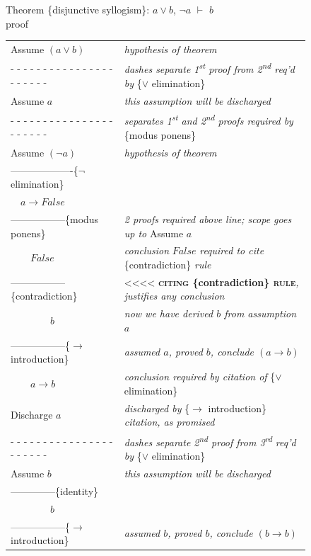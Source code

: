 {{\begin{figure}
Theorem \{disjunctive syllogism\}: $a \vee b$, $\neg a$ $\vdash$ $b$ \\
proof
\begin{center}
\begin{tabular}{ll}
Assume $(a \vee b)$          &\emph{hypothesis of theorem}\\
 - - - - - - - - - - - - - - - - - - - - - -&\emph{dashes separate 1\textsuperscript{st} proof from 2\textsuperscript{nd} req'd by} \{$\vee$ elimination\}\\
Assume $a$          & \emph{this assumption will be discharged}\\
 - - - - - - - - - - - - - - - - - - - - - -& \emph{separates 1\textsuperscript{st} and 2\textsuperscript{nd} proofs required by} \{modus ponens\} \\
Assume $(\neg a)$        & \emph{hypothesis of theorem}\\
-------------------\{$\neg$ elimination\} \\
~~$a \rightarrow False$ &\\
-----------------\{modus ponens\} &\emph{2 proofs required above line; scope goes up to} Assume $a$\\
~~~~$False$            &\emph{conclusion} $False$ \emph{required to cite} \{contradiction\} \emph{rule}\\
-----------------\{contradiction\} &<<<< \textbf{\textsc{citing} \{contradiction\} \textsc{rule}}\emph{, justifies any conclusion}\\
~~~~~~~~$b$              &\emph{now we have derived $b$ from assumption $a$}\\
-----------------\{$\rightarrow$ introduction\} & \emph{assumed $a$, proved $b$, conclude $(a \rightarrow b)$}\\
~~~~$a \rightarrow b$ &\emph{conclusion required by citation of} \{$\vee$ elimination\} \\
Discharge $a$    &\emph{discharged by} \{$\rightarrow$ introduction\} \emph{citation, as promised}\\
 - - - - - - - - - - - - - - - - - - - - - -&\emph{dashes separate 2\textsuperscript{nd} proof from 3\textsuperscript{rd} req'd by} \{$\vee$ elimination\}\\
Assume $b$          &\emph{this assumption will be discharged}\\
--------------\{identity\} &\\
~~~~~~~~$b$          &\\
-----------------\{$\rightarrow$ introduction\} &\emph{assumed $b$, proved $b$, conclude $(b \rightarrow b)$}\\

\end{tabular}
\end{center}
\end{figure}}}
